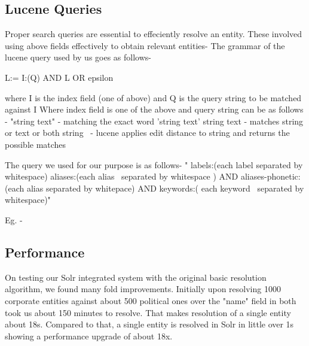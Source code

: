 \subsection{Lucene Queries}
    Proper search queries are essential to effeciently resolve an entity. These involved using above fields effectively to obtain relevant entities- 
    The grammar of the lucene query used by us goes as follows-

    L:= I:(Q) AND L OR epsilon

    where I is the index field (one of above) and Q is the query string to be matched against I
    Where index field is one of the above and query string can be as follows -
    "string text" - matching the exact word 'string text'
    string text - matches string or text or both
    string~ - lucene applies edit distance to string and returns the possible matches

    The query we used for our purpose is as follows-
    " labels:(each label separated by whitespace) aliases:(each alias~ separated by whitespace ) AND aliases-phonetic:(each alias separated by whitepace) AND keywords:( each keyword~ separated by whitespace)"

    Eg. - 
\subsection{Performance}
    On testing our Solr integrated system with the original basic resolution algorithm, we found many fold improvements. Initially upon resolving 1000 corporate entities against about 500 political ones over the "name" field in both took us about 150 minutes to resolve. That makes resolution of a single entity about 18s.
    Compared to that, a single entity is resolved in Solr in little over 1s showing a performance upgrade of about 18x.

